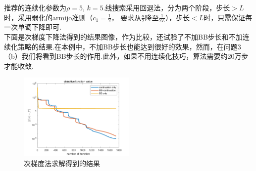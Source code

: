 \documentclass[10pt,a4paper]{article}
\begin{document}
\indent 推荐的连续化参数为$\rho=5$, $k=5$.线搜索采用回退法，分为两个阶段，步长$>L$时，采用弱化的armijo准则（$c_{1}=\frac{1}{2}$， 要求从$\frac{a}{2}$降至$\frac{1}{2L}$），步长$<L$时，只需保证每一次单调下降即可.\\
\indent 下面是次梯度下降法得到的结果图像，作为比较，还试验了不加BB步长和不加连续化策略的结果.在本例中，不加BB步长也能达到很好的效果，然而，在问题3（b）我们将看到BB步长的作用.此外，如果不用连续化技巧，算法需要约20万步才能收敛.
\begin{figure}[ht]
	\centering
	\includegraphics[width=0.5\textwidth]{figure.3(a).png}
	\caption{次梯度法求解得到的结果}
	\label{9}
\end{figure}
\end{document}
